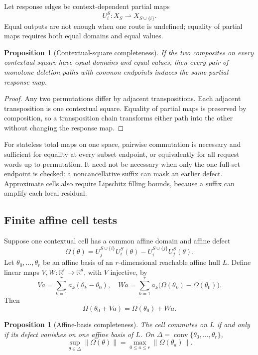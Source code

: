 \documentclass[10pt]{article}
\newtheorem{proposition}[theorem]{Proposition}
\theoremstyle{definition}
\theoremstyle{remark}
\newcommand{\R}{\mathbb{R}}
\begin{document}
Let response edges be context-dependent partial maps
\[
  U_i^S:X_S\rightharpoonup X_{S\cup\{i\}}.
\]
Equal outputs are not enough when one route is undefined; equality of partial
maps requires both equal domains and equal values.

\begin{proposition}[Contextual-square completeness]
\label{prop:cube}
If the two composites on every contextual square have equal domains and equal
values, then every pair of monotone deletion paths with common endpoints
induces the same partial response map.
\end{proposition}

\begin{proof}
Any two permutations differ by adjacent transpositions. Each adjacent
transposition is one contextual square. Equality of partial maps is preserved
by composition, so a transposition chain transforms either path into the
other without changing the response map.
\end{proof}

For stateless total maps on one space, pairwise commutation is necessary and
sufficient for equality at every subset endpoint, or equivalently for all
request words up to permutation. It need not be necessary when only the one
full-set endpoint is checked: a noncancellative suffix can mask an earlier
defect. Approximate cells also require Lipschitz filling bounds, because a
suffix can amplify each local residual.

\subsection{Finite affine cell tests}

Suppose one contextual cell has a common affine domain and affine defect
\[
 \Omega(\theta)
 =
 U_j^{S\cup\{i\}}U_i^S(\theta)
 -
 U_i^{S\cup\{j\}}U_j^S(\theta).
\]
Let \(\theta_0,\ldots,\theta_r\) be an affine basis of an \(r\)-dimensional
reachable affine hull \(L\). Define linear maps \(V,W:\R^r\to\R^d\), with
\(V\) injective, by
\[
 Va=\sum_{k=1}^r a_k(\theta_k-\theta_0),
\quad
 Wa=\sum_{k=1}^r a_k
 \bigl(\Omega(\theta_k)-\Omega(\theta_0)\bigr).
\]
Then
\[
  \Omega(\theta_0+Va)=\Omega(\theta_0)+Wa.
  \tag{6.2}\label{eq:affine-reconstruction}
\]

\begin{proposition}[Affine-basis completeness]
\label{prop:affine}
The cell commutes on \(L\) if and only if its defect vanishes on one affine
basis of \(L\). On
\(\Delta=\operatorname{conv}\{\theta_0,\ldots,\theta_r\}\),
\[
 \sup_{\theta\in\Delta}\|\Omega(\theta)\|
 =
 \max_{0\le a\le r}\|\Omega(\theta_a)\|.
 \tag{6.3}\label{eq:simplex}
\]
\end{proposition}
\end{document}
